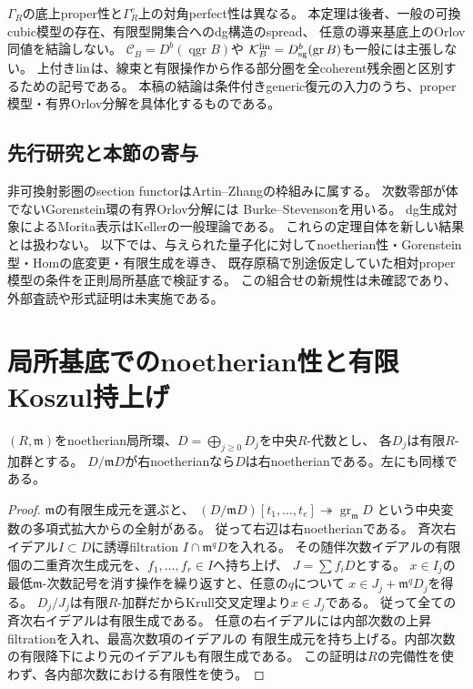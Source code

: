 \begin{remark}[主張しないこと]\label{lp:rem:limits}
$\Gamma_R$の底上proper性と$\Gamma_R^e$上の対角perfect性は異なる。
本定理は後者、一般の可換cubic模型の存在、有限型開集合へのdg構造のspread、
任意の導来基底上のOrlov同値を結論しない。
$\mathcal C_B=D^b(\operatorname{qgr}B)$や
$\mathcal K_B^{\rm lin}=D_{\rm sg}^b(\operatorname{gr}B)$も一般には主張しない。
上付き${\rm lin}$は、線束と有限操作から作る部分圏を全coherent残余圏と区別するための記号である。
本稿の結論は条件付きgeneric復元の入力のうち、proper模型・有界Orlov分解を具体化するものである。
\end{remark}

\subsection{先行研究と本節の寄与}
非可換射影圏のsection functorはArtin--Zhangの枠組み\cite{LP-AZ}に属する。
次数零部が体でないGorenstein環の有界Orlov分解には
Burke--Stevenson\cite[Definition 5.1, Lemmas 6.1--6.2, Theorem 6.4]{LP-BS}を用いる。
dg生成対象によるMorita表示はKeller\cite[Theorem 3.8]{LP-Keller}の一般理論である。
これらの定理自体を新しい結果とは扱わない。
以下では、与えられた量子化に対してnoetherian性・Gorenstein型・Homの底変更・有限生成を導き、
既存原稿で別途仮定していた相対proper模型の条件を正則局所基底で検証する。
この組合せの新規性は未確認であり、外部査読や形式証明は未実施である。

\section{局所基底でのnoetherian性と有限Koszul持上げ}
\label{lp:sec:lift}
\begin{lemma}[次数別有限性を用いたnoetherian性]\label{lp:lem:noetherian}
$(R,\mathfrak m)$をnoetherian局所環、$D=\bigoplus_{j\ge0}D_j$を中央$R$-代数とし、
各$D_j$は有限$R$-加群とする。
$D/\mathfrak mD$が右noetherianなら$D$は右noetherianである。左にも同様である。
\end{lemma}
\begin{proof}
$\mathfrak m$の有限生成元を選ぶと、
$(D/\mathfrak mD)[t_1,\ldots,t_e]\twoheadrightarrow\operatorname{gr}_{\mathfrak m}D$
という中央変数の多項式拡大からの全射がある。
従って右辺は右noetherianである。
斉次右イデアル$I\subset D$に誘導filtration $I\cap\mathfrak m^qD$を入れる。
その随伴次数イデアルの有限個の二重斉次生成元を、$f_1,\ldots,f_r\in I$へ持ち上げ、
$J=\sum f_iD$とする。
$x\in I_j$の最低$\mathfrak m$-次数記号を消す操作を繰り返すと、任意の$q$について
$x\in J_j+\mathfrak m^qD_j$を得る。
$D_j/J_j$は有限$R$-加群だからKrull交叉定理より$x\in J_j$である。
従って全ての斉次右イデアルは有限生成である。
任意の右イデアルには内部次数の上昇filtrationを入れ、最高次数項のイデアルの
有限生成元を持ち上げる。内部次数の有限降下により元のイデアルも有限生成である。
この証明は$R$の完備性を使わず、各内部次数における有限性を使う。
\end{proof}

